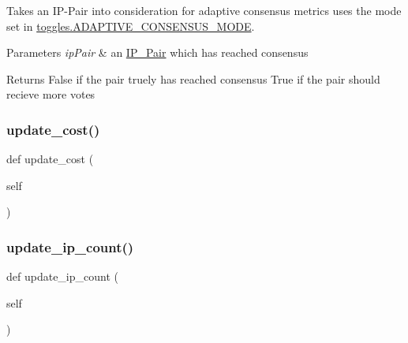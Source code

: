 Takes an I\+P-\/\+Pair into consideration for adaptive consensus metrics uses the mode set in \hyperlink{namespacedynamicfilterapp_1_1toggles_a394fa3f8531c2ecc987f982367a4af2d}{toggles.\+A\+D\+A\+P\+T\+I\+V\+E\+\_\+\+C\+O\+N\+S\+E\+N\+S\+U\+S\+\_\+\+M\+O\+DE}. 


\begin{DoxyParams}{Parameters}
{\em ip\+Pair} & an \hyperlink{classdynamicfilterapp_1_1models_1_1_i_p___pair}{I\+P\+\_\+\+Pair} which has reached consensus \\
\hline
\end{DoxyParams}
\begin{DoxyReturn}{Returns}
False if the pair truely has reached consensus True if the pair should recieve more votes 
\end{DoxyReturn}
\mbox{\label{classdynamicfilterapp_1_1models_1_1_predicate_a848ee4c7a2121d6e272137b6d3c8b843}} 
\subsubsection{\texorpdfstring{update\+\_\+cost()}{update\_cost()}}
{\footnotesize\ttfamily def update\+\_\+cost (\begin{DoxyParamCaption}\item[{}]{self }\end{DoxyParamCaption})}

\mbox{\label{classdynamicfilterapp_1_1models_1_1_predicate_af28772c782daf9e16362c89252e4c75c}} 
\subsubsection{\texorpdfstring{update\+\_\+ip\+\_\+count()}{update\_ip\_count()}}
{\footnotesize\ttfamily def update\+\_\+ip\+\_\+count (\begin{DoxyParamCaption}\item[{}]{self }\end{DoxyParamCaption})}

